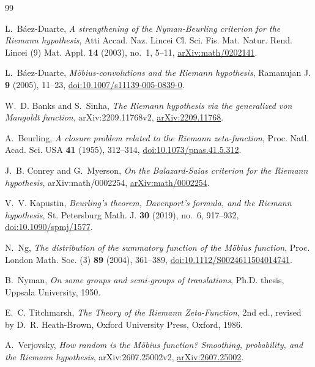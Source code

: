 \documentclass[11pt,a4paper]{amsart}
\theoremstyle{definition}
\theoremstyle{remark}
\begin{document}
\begin{thebibliography}{99}

L.~B\'aez-Duarte,
\emph{A strengthening of the Nyman-Beurling criterion for the Riemann hypothesis},
Atti Accad. Naz. Lincei Cl. Sci. Fis. Mat. Natur. Rend. Lincei (9)
Mat. Appl. \textbf{14} (2003), no.~1, 5--11,
\href{https://arxiv.org/abs/math/0202141}{arXiv:math/0202141}.

L.~B\'aez-Duarte,
\emph{M\"obius-convolutions and the Riemann hypothesis},
Ramanujan J. \textbf{9} (2005), 11--23,
\href{https://doi.org/10.1007/s11139-005-0839-0}{doi:10.1007/s11139-005-0839-0}.

W.~D. Banks and S.~Sinha,
\emph{The Riemann hypothesis via the generalized von Mangoldt function},
arXiv:2209.11768v2,
\href{https://arxiv.org/abs/2209.11768}{arXiv:2209.11768}.

A.~Beurling,
\emph{A closure problem related to the Riemann zeta-function},
Proc. Natl. Acad. Sci. USA \textbf{41} (1955), 312--314,
\href{https://doi.org/10.1073/pnas.41.5.312}{doi:10.1073/pnas.41.5.312}.

J.~B. Conrey and G.~Myerson,
\emph{On the Balazard-Saias criterion for the Riemann hypothesis},
arXiv:math/0002254,
\href{https://arxiv.org/abs/math/0002254}{arXiv:math/0002254}.

V.~V. Kapustin,
\emph{Beurling's theorem, Davenport's formula, and the Riemann hypothesis},
St. Petersburg Math. J. \textbf{30} (2019), no.~6, 917--932,
\href{https://doi.org/10.1090/spmj/1577}{doi:10.1090/spmj/1577}.

N.~Ng,
\emph{The distribution of the summatory function of the M\"obius function},
Proc. London Math. Soc. (3) \textbf{89} (2004), 361--389,
\href{https://doi.org/10.1112/S0024611504014741}{doi:10.1112/S0024611504014741}.

B.~Nyman,
\emph{On some groups and semi-groups of translations},
Ph.D. thesis, Uppsala University, 1950.

E.~C. Titchmarsh,
\emph{The Theory of the Riemann Zeta-Function},
2nd ed., revised by D.~R. Heath-Brown,
Oxford University Press, Oxford, 1986.

A.~Verjovsky,
\emph{How random is the M\"obius function? Smoothing, probability, and the Riemann hypothesis},
arXiv:2607.25002v2,
\href{https://arxiv.org/abs/2607.25002}{arXiv:2607.25002}.

\end{thebibliography}
\end{document}
